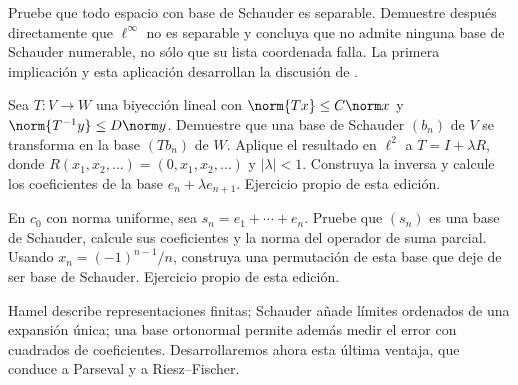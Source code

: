 \begin{ejercicio}\label{ej:ampl-schauder-3}
Pruebe que todo espacio con base de Schauder es separable. Demuestre después directamente que $\ell^\infty$ no es separable y concluya que no admite ninguna base de Schauder numerable, no sólo que su lista coordenada falla. La primera implicación y esta aplicación desarrollan la discusión de \cite{max-schauder}.
\end{ejercicio}


\begin{ejercicio}\label{ej:ampl-schauder-4}
Sea $T:V\to W$ una biyección lineal con $\norm{Tx}\le C\norm x$ y $\norm{T^{-1}y}\le D\norm y$. Demuestre que una base de Schauder $(b_n)$ de $V$ se transforma en la base $(Tb_n)$ de $W$. Aplique el resultado en $\ell^2$ a $T=I+\lambda R$, donde $R(x_1,x_2,\ldots)=(0,x_1,x_2,\ldots)$ y $|\lambda|<1$. Construya la inversa y calcule los coeficientes de la base $e_n+\lambda e_{n+1}$. Ejercicio propio de esta edición.
\end{ejercicio}


\begin{ejercicio}\label{ej:ampl-schauder-5}
En $c_0$ con norma uniforme, sea $s_n=e_1+\cdots+e_n$. Pruebe que $(s_n)$ es una base de Schauder, calcule sus coeficientes y la norma del operador de suma parcial. Usando $x_n=(-1)^{n-1}/n$, construya una permutación de esta base que deje de ser base de Schauder. Ejercicio propio de esta edición.
\end{ejercicio}


Hamel describe representaciones finitas; Schauder añade límites ordenados de una expansión única; una base ortonormal permite además medir el error con cuadrados de coeficientes. Desarrollaremos ahora esta última ventaja, que conduce a Parseval y a Riesz--Fischer.

